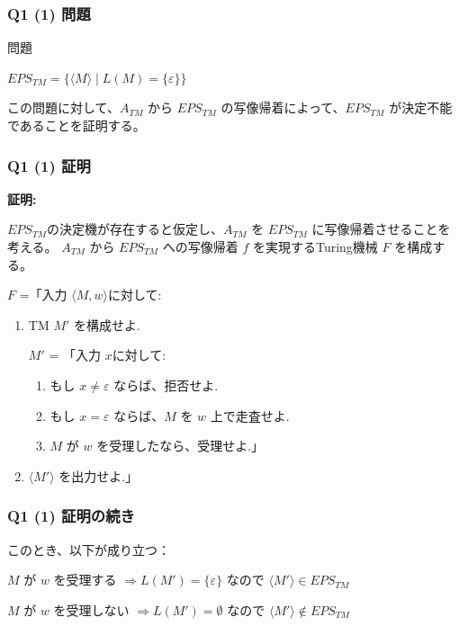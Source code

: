 \begin{frame}[fragile]
\frametitle{Q1 (1) 問題}

\begin{alertblock}{問題}

$EPS_{TM} = \{\langle M \rangle \mid L(M) = \{\varepsilon\}\}$

\end{alertblock}

この問題に対して、$A_{TM}$ から $EPS_{TM}$ の写像帰着によって、$EPS_{TM}$ が決定不能であることを証明する。

\end{frame}

\begin{frame}[fragile]
\frametitle{Q1 (1) 証明}

\textbf{証明:}

$EPS_{TM}$の決定機が存在すると仮定し、$A_{TM}$ を $EPS_{TM}$ に写像帰着させることを考える。
$A_{TM}$ から $EPS_{TM}$ への写像帰着 $f$ を実現するTuring機械 $F$ を構成する。

$F$ =「入力 $\langle M, w  \rangle$に対して:

\begin{enumerate}
    \item TM $M'$ を構成せよ.

     $M'$ = 「入力 $x$に対して:

    \begin{enumerate}
        \item[1.] もし $x  \neq \varepsilon$ ならば、拒否せよ.
        \item[2.] もし $x = \varepsilon$ ならば、$M$ を $w$ 上で走査せよ.
        \item[3.] $M$ が $w$ を受理したなら、受理せよ.」
    \end{enumerate}

    \item $\langle M' \rangle$ を出力せよ.」

\end{enumerate}

\end{frame}

\begin{frame}[fragile]
\frametitle{Q1 (1) 証明の続き}

このとき、以下が成り立つ：


$M \text{ が } w \text{ を受理する } \Longrightarrow  L(M') = \{\varepsilon\}$ なので $\langle M' \rangle \in EPS_{TM}$


$M \text{ が } w \text{ を受理しない } \Longrightarrow  L(M') = \emptyset$ なので $\langle M' \rangle \notin EPS_{TM}$



\end{frame}

